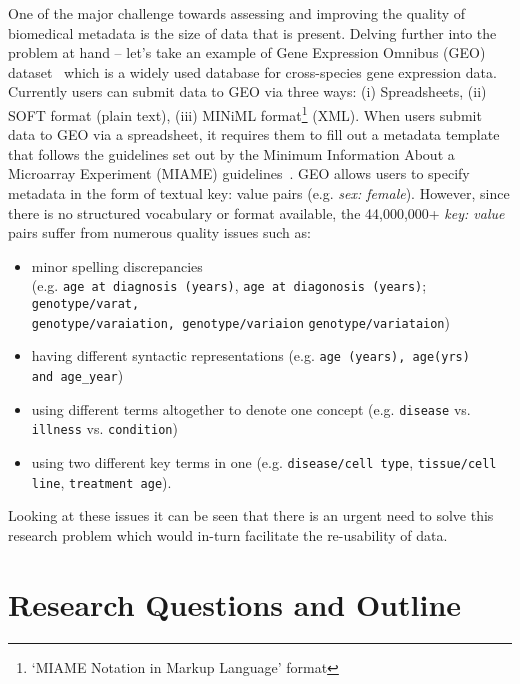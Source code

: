 One of the major challenge towards assessing and improving the quality of biomedical metadata is the size of data that is present.  Delving further into the problem at hand -- let's take an example of Gene Expression Omnibus (GEO) dataset~\cite{edgar2002gene} which is a widely used database for cross-species gene expression data. Currently users can submit data to GEO via three ways: (i) Spreadsheets, (ii) SOFT format (plain text), (iii) MINiML format\footnote{`MIAME Notation in Markup Language' format} (XML).
When users submit data to GEO via a spreadsheet, it requires them to fill out a metadata template that follows the guidelines set out by the Minimum Information About a Microarray Experiment (MIAME) guidelines~\cite{brazma2001minimum}. GEO allows users to specify metadata in the form of textual key: value pairs (e.g. \emph{sex: female}). However, since there is no structured vocabulary or format available, the 44,000,000+ \emph{key: value} pairs suffer from numerous quality issues such as:
\begin{itemize}
\item minor spelling discrepancies\\ (e.g. \verb|age at diagnosis (years)|, \verb|age at diagonosis (years)|; 
\verb|genotype/varat,|\\ \verb|genotype/varaiation, genotype/variaion| \verb|genotype/variataion|)
\item having different syntactic representations (e.g. \verb|age (years), age(yrs)|\\ \verb|and age_year|)
\item using different terms altogether to denote one concept (e.g. \verb|disease| vs. \verb|illness| vs. \verb|condition|)
\item using two different key terms in one (e.g. \verb|disease/cell type|, \verb|tissue/cell line|, \verb|treatment age|).
\end{itemize} 
Looking at these issues it can be seen that there is an urgent need to solve this research problem which would in-turn facilitate the re-usability of data. 

\section{Research Questions and Outline}

